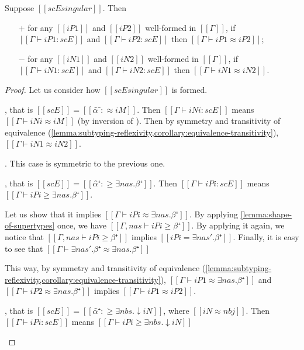 \begin{lemma}
    \label{lemma:entry-singularity-soundness}
    Suppose $[[scE singular]]$.
    Then 
    \begin{itemize}
        \item [$+$] for any $[[iP1]]$ and $[[iP2]]$ well-formed in $[[Γ]]$,
            if $[[Γ ⊢ iP1 : scE]]$ and $[[Γ ⊢ iP2 : scE]]$ then $[[Γ ⊢ iP1 ≈ iP2]]$;
        \item [$-$] for any $[[iN1]]$ and $[[iN2]]$ well-formed in $[[Γ]]$,
            if $[[Γ ⊢ iN1 : scE]]$ and $[[Γ ⊢ iN2 : scE]]$ then $[[Γ ⊢ iN1 ≈ iN2]]$.
    \end{itemize}
\end{lemma}
\begin{proof}
    Let us consider how $[[scE singular]]$ is formed.
    \begin{caseof}
        \item {}, that is $[[scE]] = [[α̂⁻ :≈ iM]]$.
            Then $[[Γ ⊢ iNi : scE]]$ means $[[Γ ⊢ iNi ≈ iM]]$ 
            (by inversion of ).
            Then by symmetry and transitivity of equivalence (\cref{lemma:subtyping-reflexivity,corollary:equivalence-transitivity}), 
            $[[Γ ⊢ iN1 ≈ iN2]]$.
        \item {}. This case is symmetric to the previous one.

        \item {}, that is 
            $[[scE]] = [[α̂⁺ :≥ ∃nas.β⁺]]$.
            Then $[[Γ ⊢ iPi : scE]]$ means $[[Γ ⊢ iPi ≥ ∃nas.β⁺]]$.
        
            Let us show that it implies $[[Γ ⊢ iPi ≈ ∃nas.β⁺]]$.
            By applying \cref{lemma:shape-of-supertypes} once, 
            we have $[[Γ, nas ⊢ iPi ≥ β⁺]]$.
            By applying it again, we notice that
            $[[Γ, nas ⊢ iPi ≥ β⁺]]$ implies $[[iPi = ∃nas'.β⁺]]$.
            Finally, it is easy to see that $[[Γ ⊢ ∃nas'.β⁺ ≈ ∃nas.β⁺]]$

            This way, by symmetry and transitivity of equivalence (\cref{lemma:subtyping-reflexivity,corollary:equivalence-transitivity}),
            $[[Γ ⊢ iP1 ≈ ∃nas.β⁺]]$ and $[[Γ ⊢ iP2 ≈ ∃nas.β⁺]]$ implies $[[Γ ⊢ iP1 ≈ iP2]]$.

        \item {},
            that is $[[scE]] = [[α̂⁺ :≥ ∃nbs.↓iN]]$, 
            where $[[iN ≈ nbj]]$.
            Then $[[Γ ⊢ iPi : scE]]$ means $[[Γ ⊢ iPi ≥ ∃nbs.↓iN]]$




\end{caseof}
\end{proof}
